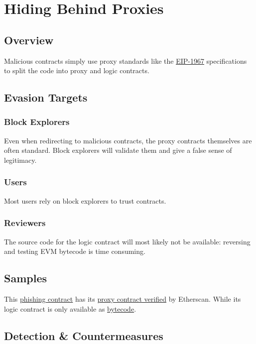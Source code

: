 \section{Hiding Behind Proxies} \label{sec:hiding-behind-proxies}

\subsection{Overview}

Malicious contracts simply use proxy standards like the \href{\urlstandardeipproxy}{EIP-1967} specifications to split the code into proxy and logic contracts.

\subsection{Evasion Targets}

\subsubsection{Block Explorers}

Even when redirecting to malicious contracts, the proxy contracts themselves are often standard.
Block explorers will validate them and give a false sense of legitimacy.

\subsubsection{Users}

Most users rely on block explorers to trust contracts.

\subsubsection{Reviewers}

The source code for the logic contract will most likely not be available:
reversing and testing EVM bytecode is time consuming.

\subsection{Samples}

This \href{}{phishing contract} has its \href{}{proxy contract verified} by Etherscan.
While its logic contract is only available as \href{}{bytecode}.

\subsection{Detection \& Countermeasures}

